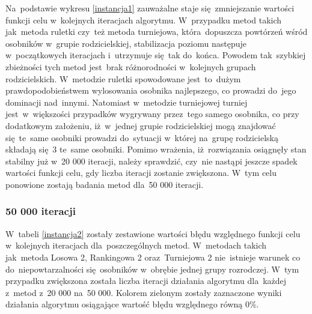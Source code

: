 Na~podstawie wykresu \ref{instancja1} zauważalne staje się~zmniejszanie wartości funkcji celu w~kolejnych iteracjach algorytmu. W~przypadku metod takich jak~metoda ruletki czy~też metoda turniejowa, która~dopuszcza powtórzeń wśród osobników w~grupie rodzicielskiej, stabilizacja poziomu następuje w~początkowych iteracjach i~utrzymuje się~tak do~końca. Powodem tak~szybkiej zbieżności tych metod jest~brak różnorodności w~kolejnych grupach rodzicielskich. W~metodzie ruletki spowodowane jest~to~dużym prawdopodobieństwem wylosowania osobnika najlepszego, co prowadzi do~jego dominacji nad~innymi. Natomiast w~metodzie turniejowej turniej jest~w~większości przypadków wygrywany przez~tego samego osobnika, co przy dodatkowym założeniu, iż~w~jednej grupie rodzicielskiej mogą znajdować się~te~same osobniki prowadzi do~sytuacji w~której na~grupę rodzicielską składają się~3 te~same osobniki. Pomimo wrażenia, iż~rozwiązania osiągnęły stan stabilny już w~20 000 iteracji, należy sprawdzić, czy~nie nastąpi jeszcze spadek wartości funkcji celu, gdy liczba iteracji zostanie zwiększona. W~tym celu ponowione zostają badania metod dla~50 000 iteracji.\\

\subsubsection{50 000 iteracji}

 W~tabeli \ref{instancja2} zostały zestawione wartości błędu względnego funkcji celu w~kolejnych iteracjach dla~poszczególnych metod. W~metodach takich jak~metoda Losowa 2, Rankingowa 2 oraz~Turniejowa 2 nie~istnieje warunek co do~niepowtarzalności się~osobników w~obrębie jednej grupy rozrodczej. W~tym przypadku zwiększona została liczba iteracji działania algorytmu dla~każdej z~metod z~20 000 na~50 000. Kolorem zielonym zostały zaznaczone wyniki działania algorytmu osiągające wartość błędu względnego równą 0\%.

